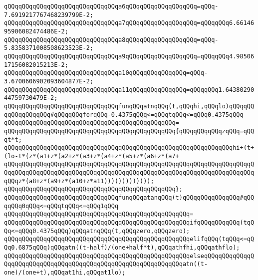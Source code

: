 \verb|qQQqqQQqqQQqqQQqqQQqqQQqqQQqqQQqa6qQQqqQQqqQQqqQQqqQQq=qQQq-7.6919217767468239799E-2;|\newline
\verb|qQQqqQQqqQQqqQQqqQQqqQQqqQQqqQQqa7qQQqqQQqqQQqqQQqqQQq=qQQqqQQq6.6614695906082474486E-2;|\newline
\verb|qQQqqQQqqQQqqQQqqQQqqQQqqQQqqQQqa8qQQqqQQqqQQqqQQqqQQq=qQQq-5.8358371008508623523E-2;|\newline
\verb|qQQqqQQqqQQqqQQqqQQqqQQqqQQqqQQqa9qQQqqQQqqQQqqQQqqQQq=qQQqqQQq4.9850617156082015213E-2;|\newline
\verb|qQQqqQQqqQQqqQQqqQQqqQQqqQQqqQQqa10qQQqqQQqqQQqqQQq=qQQq-3.6700606902093604877E-2;|\newline
\verb|qQQqqQQqqQQqqQQqqQQqqQQqqQQqqQQqa11qQQqqQQqqQQqqQQq=qQQqqQQq1.6438029044759730479E-2;|\newline
\newline
\verb|qQQqqQQqqQQqqQQqqQQqqQQqqQQqqQQqfunqQQqatnqQQq(t,qQQqhi,qQQqlo)qQQqqQQqqQQqqQQqqQQq#qQQqqQQqforqQQq-0.4375qQQq<=qQQqtqQQq<=qQQq0.4375qQQq|\newline
\verb|qQQqqQQqqQQqqQQqqQQqqQQqqQQqqQQqqQQqqQQqqQQqqQQq=|\newline
\verb|qQQqqQQqqQQqqQQqqQQqqQQqqQQqqQQqqQQqqQQqqQQqqQQq{qQQqqQQqqQQqzqQQq=qQQqt*t;|\newline
\newline
\verb|qQQqqQQqqQQqqQQqqQQqqQQqqQQqqQQqqQQqqQQqqQQqqQQqqQQqqQQqqQQqqQQqhi+(t+(lo-t*(z*(a1+z*(a2+z*(a3+z*(a4+z*(a5+z*(a6+z*(a7+|\newline
\verb|qQQqqQQqqQQqqQQqqQQqqQQqqQQqqQQqqQQqqQQqqQQqqQQqqQQqqQQqqQQqqQQqqQQqqQQqqQQqqQQqqQQqqQQqqQQqqQQqqQQqqQQqqQQqqQQqqQQqqQQqqQQqqQQqqQQqqQQqqQQqqQQqz*(a8+z*(a9+z*(a10+z*a11)))))))))))));|\newline
\verb|qQQqqQQqqQQqqQQqqQQqqQQqqQQqqQQqqQQqqQQqqQQqqQQq};|\newline
\newline
\verb|qQQqqQQqqQQqqQQqqQQqqQQqqQQqqQQqfunqQQqatanqQQq(t)qQQqqQQqqQQqqQQq#qQQqqQQq0qQQq<=qQQqtqQQq<=qQQq1qQQq|\newline
\verb|qQQqqQQqqQQqqQQqqQQqqQQqqQQqqQQqqQQqqQQqqQQqqQQqqQQq=|\newline
\verb|qQQqqQQqqQQqqQQqqQQqqQQqqQQqqQQqqQQqqQQqqQQqqQQqqQQqifqQQqqQQqqQQq(tqQQq<=qQQq0.4375qQQq)qQQqatnqQQq(t,qQQqzero,qQQqzero);|\newline
\verb|qQQqqQQqqQQqqQQqqQQqqQQqqQQqqQQqqQQqqQQqqQQqqQQqqQQqelifqQQq(tqQQq<=qQQq0.6875qQQq)qQQqatn((t-half)/(one+half*t),qQQqathfhi,qQQqathflo);|\newline
\verb|qQQqqQQqqQQqqQQqqQQqqQQqqQQqqQQqqQQqqQQqqQQqqQQqqQQqelseqQQqqQQqqQQqqQQqqQQqqQQqqQQqqQQqqQQqqQQqqQQqqQQqqQQqqQQqqQQqqQQqatn((t-one)/(one+t),qQQqat1hi,qQQqat1lo);|\newline
